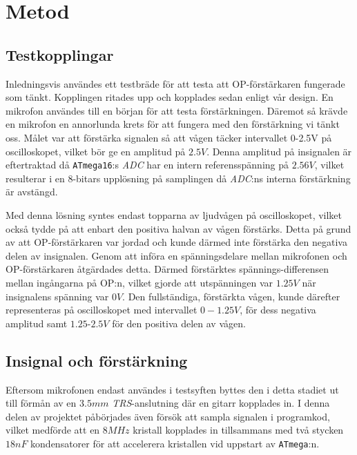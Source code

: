 \documentclass[a4paper]{article}
\begin{document}
\section{Metod}
\subsection{Testkopplingar}
Inledningsvis användes ett testbräde för att testa att OP-förstärkaren fungerade som tänkt. Kopplingen ritades upp och kopplades sedan enligt vår design. En mikrofon användes till en början för att testa förstärkningen. Däremot så krävde en mikrofon en annorlunda krets för att fungera med den förstärkning vi tänkt oss. Målet var att förstärka signalen så att vågen täcker intervallet 0-2.5V på oscilloskopet, vilket bör ge en amplitud på $2.5V$. Denna amplitud på insignalen är eftertraktad då \texttt{ATmega16}:s \textit{ADC} har en intern referensspänning på $2.56V$, vilket resulterar i en 8-bitars upplösning på samplingen då \textit{ADC}:ns interna förstärkning är avstängd.\cite[p.~205]{atmega16}

Med denna lösning syntes endast topparna av ljudvågen på oscilloskopet, vilket också tydde på att enbart den positiva halvan av vågen förstärks. Detta på grund av att OP-förstärkaren var jordad och kunde därmed inte förstärka den negativa delen av insignalen. Genom att införa en spänningsdelare mellan mikrofonen och OP-förstärkaren åtgärdades detta. Därmed förstärktes spännings-differensen mellan ingångarna på OP:n, vilket gjorde att utspänningen var $1.25V$ när insignalens spänning var $0V$. Den fullständiga, förstärkta vågen, kunde därefter representeras på oscilloskopet med intervallet $0-1.25V$, för dess negativa amplitud samt $1.25$-$2.5V$ för den positiva delen av vågen.

\subsection{Insignal och förstärkning}
Eftersom mikrofonen endast användes i testsyften byttes den i detta stadiet ut till förmån av en $3.5mm$ \textit{TRS}-anslutning där en gitarr kopplades in. I denna delen av projektet påbörjades även försök att sampla signalen i programkod, vilket medförde att en $8MHz$ kristall kopplades in tillsammans med två stycken $18nF$ kondensatorer\cite{hw} för att accelerera kristallen vid uppstart av \texttt{ATmega}:n.\cite{oscillator}
\end{document}
